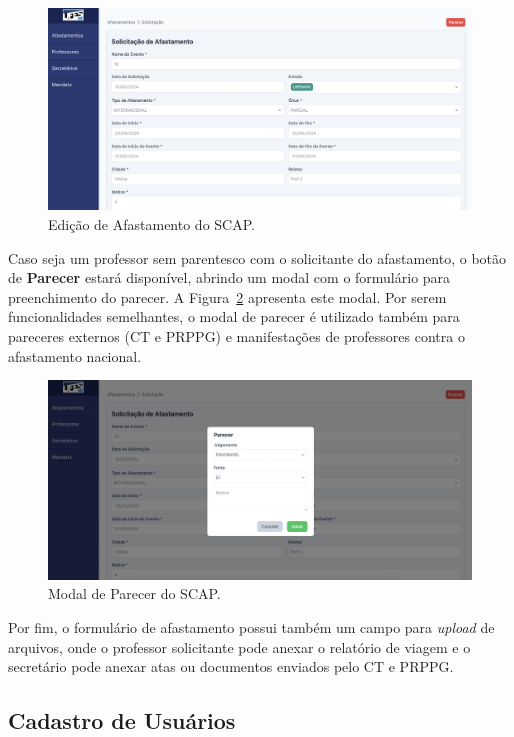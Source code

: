 \begin{figure}
    \centering
    \includegraphics[width=\textwidth]{figuras/prints-app/fig-editar-afastamento.png}
    \caption{Edição de Afastamento do SCAP.}
    \label{fig-editar-afastamento}
\end{figure}

Caso seja um professor sem parentesco com o solicitante do afastamento, o botão de \textbf{Parecer} estará disponível,
abrindo um modal com o formulário para preenchimento do parecer. A Figura~\ref{fig-parecer} apresenta este modal.
Por serem funcionalidades semelhantes, o modal de parecer é utilizado também para pareceres externos (CT e PRPPG) e manifestações
de professores contra o afastamento nacional.

\begin{figure}
    \centering
    \includegraphics[width=\textwidth]{figuras/prints-app/fig-parecer.png}
    \caption{Modal de Parecer do SCAP.}
    \label{fig-parecer}
\end{figure}

Por fim, o formulário de afastamento possui também um campo para \textit{upload} de arquivos, onde o professor solicitante
pode anexar o relatório de viagem e o secretário pode anexar atas ou documentos enviados pelo CT e PRPPG.

\subsection{Cadastro de Usuários}
\label{subsec-projeto-cadastro-usuarios}

